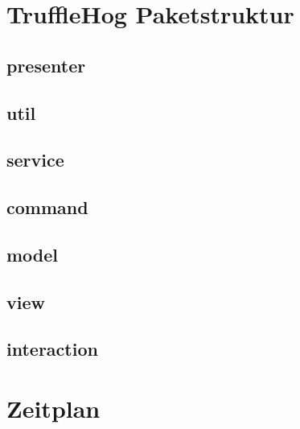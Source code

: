\documentclass[18pt]{beamer}
\begin{document}
\section{TruffleHog Paketstruktur}
	
	\subsection{presenter}
		
	\subsection{util}
		
	\subsection{service}
		
	\subsection{command}
		
	\subsection{model}
		
		
	\subsection{view}
		
	\subsection{interaction}
		

\section{Zeitplan}

\appendix
\beginbackup
\backupend
\end{document}
